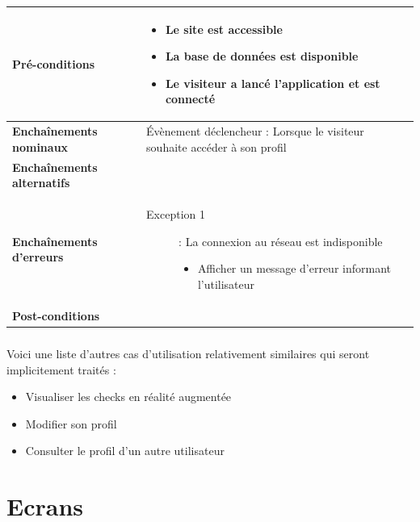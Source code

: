 \documentclass[a4paper,12pt]{report}
\begin{document}
\begin{onehalfspace}
\begin{tabular}{|p{3cm}|p{}|}
\textbf{Pré-conditions} &
    \begin{itemize}
      \item Le site est accessible
      \item La base de données est disponible
      \item Le visiteur a lancé l'application et est connecté
    \end{itemize}
\\ \hline %

\textbf{Enchaînements nominaux} &
  Évènement déclencheur : Lorsque le visiteur souhaite accéder à son profil
\\ \hline %

\textbf{Enchaînements alternatifs} &
\\ \hline %

\textbf{Enchaînements d'erreurs} &
  \begin{description}
    \item[Exception 1]: La connexion au réseau est indisponible
    \begin{itemize}
      \item Afficher un message d’erreur informant l'utilisateur
    \end{itemize}
  \end{description}
\\ \hline %

\textbf{Post-conditions} &
\\ \hline %

\end{tabular}

\paragraph*{}
Voici une liste d'autres cas d'utilisation relativement similaires qui seront implicitement traités :
\begin{itemize}
  \item Visualiser les checks en réalité augmentée
  \item Modifier son profil
  \item Consulter le profil d'un autre utilisateur
\end{itemize}

\chapter{Ecrans} %
\label{cha:ecrans_suppl_mentaires}

\setcounter{hauteurscreen}{17}


\end{onehalfspace}
\end{document}
